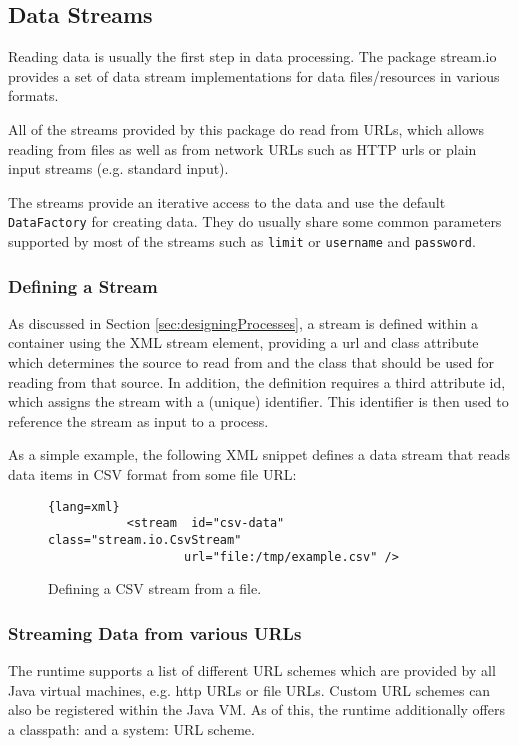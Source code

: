 \subsection{\label{app:dataStreams}\label{api:stream:io}Data Streams}

Reading data is usually the first step in data processing. The package
{\ttfamily stream.io} provides a set of data stream implementations
for data files/resources in various formats.

All of the streams provided by this package do read from URLs, which
allows reading from files as well as from network URLs such as HTTP
urls or plain input streams (e.g. standard input).

The streams provide an iterative access to the data and use the default
\texttt{DataFactory} for creating data. They do usually share some
common parameters supported by most of the streams such as
\texttt{limit} or \texttt{username} and \texttt{password}.

\subsubsection*{Defining a Stream}
As discussed in Section \ref{sec:designingProcesses}, a stream is
defined within a container using the XML {\ttfamily stream} element,
providing a {\ttfamily url} and {\ttfamily class} attribute which
determines the source to read from and the class that should be used
for reading from that source. In addition, the definition requires a
third attribute {\ttfamily id}, which assigns the stream with a
(unique) identifier. This identifier is then used to reference the
stream as input to a process.

As a simple example, the following XML snippet defines a data stream
that reads data items in CSV format from some file URL:
\begin{figure}[h!]
        \centering
        \begin{lstlisting}{lang=xml}
           <stream  id="csv-data" class="stream.io.CsvStream"
                   url="file:/tmp/example.csv" />
        \end{lstlisting}
        \caption{Defining a CSV stream from a file.}
\end{figure}

\subsubsection*{Streaming Data from various URLs}
The \streams runtime supports a list of different URL schemes which
are provided by all Java virtual machines, e.g. {\ttfamily http} URLs
or {\ttfamily file} URLs. Custom URL schemes can also be registered
within the Java VM. As of this, the \streams runtime additionally
offers a {\ttfamily classpath:} and a {\ttfamily system:} URL scheme.

